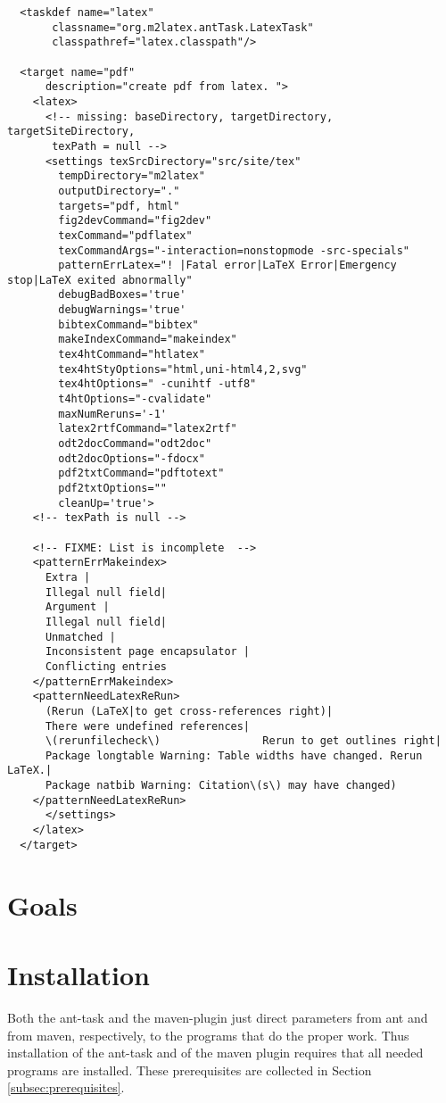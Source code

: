 \documentclass[12pt]{article}
\begin{document}
\begin{lstlisting}
  <taskdef name="latex"
	   classname="org.m2latex.antTask.LatexTask"
	   classpathref="latex.classpath"/>

  <target name="pdf"
	  description="create pdf from latex. ">
    <latex>
      <!-- missing: baseDirectory, targetDirectory, targetSiteDirectory,
	   texPath = null -->
      <settings texSrcDirectory="src/site/tex"
		tempDirectory="m2latex"
		outputDirectory="."
		targets="pdf, html"
		fig2devCommand="fig2dev"
		texCommand="pdflatex"
		texCommandArgs="-interaction=nonstopmode -src-specials"
		patternErrLatex="! |Fatal error|LaTeX Error|Emergency stop|LaTeX exited abnormally"
		debugBadBoxes='true'
		debugWarnings='true'
		bibtexCommand="bibtex"
		makeIndexCommand="makeindex"
		tex4htCommand="htlatex"
		tex4htStyOptions="html,uni-html4,2,svg"
		tex4htOptions=" -cunihtf -utf8"
		t4htOptions="-cvalidate"
		maxNumReruns='-1'
		latex2rtfCommand="latex2rtf"
		odt2docCommand="odt2doc"
		odt2docOptions="-fdocx"
		pdf2txtCommand="pdftotext"
		pdf2txtOptions=""
		cleanUp='true'>
	<!-- texPath is null -->
	
	<!-- FIXME: List is incomplete  -->
	<patternErrMakeindex>
	  Extra |
	  Illegal null field| 
	  Argument |
	  Illegal null field|
	  Unmatched |
	  Inconsistent page encapsulator |
	  Conflicting entries
	</patternErrMakeindex>
	<patternNeedLatexReRun>
	  (Rerun (LaTeX|to get cross-references right)|
	  There were undefined references|
	  \(rerunfilecheck\)                Rerun to get outlines right|
	  Package longtable Warning: Table widths have changed. Rerun LaTeX.|
	  Package natbib Warning: Citation\(s\) may have changed)
	</patternNeedLatexReRun>
      </settings>
    </latex>
  </target>
\end{lstlisting}


\section{Goals}



\section{Installation}

Both the ant-task and the maven-plugin just direct parameters 
from ant and from maven, respectively, 
to the programs that do the proper work. 
Thus installation of the ant-task and of the maven plugin 
requires that all needed programs are installed. 
These prerequisites are collected in Section \ref{subsec:prerequisites}. 
\end{document}
